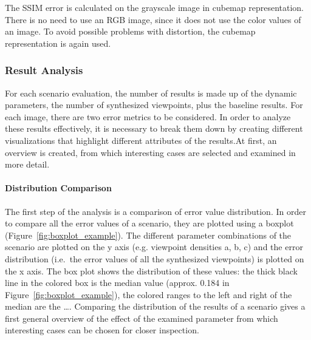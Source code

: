 The SSIM error is calculated on the grayscale image in cubemap representation. There is no need to use an RGB image, since it does not use the color values of an image. To avoid possible problems with distortion, the cubemap representation is again used.

\subsubsection{Result Analysis}
For each scenario evaluation, the number of results is made up of the dynamic parameters, the number of synthesized viewpoints, plus the baseline results. For each image, there are two error metrics to be considered.
In order to analyze these results effectively, it is necessary to break them down by creating different visualizations that highlight different attributes of the results.At first, an overview is created, from which interesting cases are selected and examined in more detail.

\paragraph{Distribution Comparison}
The first step of the analysis is a comparison of error value distribution. In order to compare all the error values of a scenario, they are plotted using a boxplot (Figure~\ref{fig:boxplot_example}). The different parameter combinations of the scenario are plotted on the y axis (e.g. viewpoint densities a, b, c) and the error distribution (i.e.\ the error values of all the synthesized viewpoints) is plotted on the x axis. The box plot shows the distribution of these values: the thick black line in the colored box is the median value (approx. 0.184 in Figure~\ref{fig:boxplot_example}), the colored ranges to the left and right of the median are the \ldots {}. Comparing the distribution of the results of a scenario gives a first general overview of the effect of the examined parameter from which interesting cases can be chosen for closer inspection.

